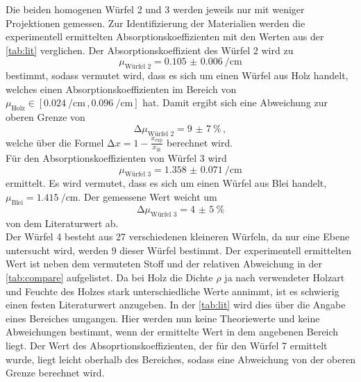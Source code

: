 \noindent Die beiden homogenen Würfel 2 und 3 werden jeweils nur mit weniger Projektionen gemessen. Zur Identifizierung der Materialien werden die 
experimentell ermittelten Absorptionskoeffizienten mit den Werten aus der \autoref{tab:lit} verglichen. Der Absorptionskoeffizient des Würfel 2 wird zu
\begin{equation*}
    \mu_{\text{Würfel 2}} = \SI{0.105(6)}{\per\centi\metre}
\end{equation*}
bestimmt, sodass vermutet wird, dass es sich um einen Würfel aus Holz handelt, welches einen Absorptionskoeffizienten im Bereich von $\mu_{\text{Holz}} \in
[\SI[per-mode=reciprocal]{0.024}{\per\centi\metre}\, , \SI[per-mode=reciprocal]{0.096}{\per\centi\metre}]$ hat. Damit ergibt sich eine Abweichung zur oberen Grenze von 
\begin{equation*}
    \increment \mu_{\text{Würfel 2}} = \SI{9(7)}{\percent}\, ,
\end{equation*}
welche über die Formel $\increment x = 1 - \frac{x_{\text{exp}}}{x_{\text{lit}}}$ berechnet wird. \\
Für den Absorptionskoeffizienten von Würfel 3 wird 
\begin{equation*}
    \mu_{\text{Würfel 3}} = \SI{1.358(71)}{\per\centi\metre}
\end{equation*}
ermittelt. Es wird vermutet, dass es sich um einen Würfel aus Blei handelt, $\mu_{\text{Blei}} = \SI[per-mode=reciprocal]{1.415}{\per\centi\metre}$. Der gemessene Wert 
weicht um 
\begin{equation*}
    \increment \mu_{\text{Würfel 3}} = \SI{4(5)}{\percent}
\end{equation*}
von dem Literaturwert ab.\\
Der Würfel 4 besteht aus 27 verschiedenen kleineren Würfeln, da nur eine Ebene untersucht wird, werden 9 dieser Würfel bestimmt. Der experimentell ermittelten 
Wert ist neben dem vermuteten Stoff und der relativen Abweichung in der \autoref{tab:compare} aufgelistet. Da bei Holz die Dichte $\rho$ ja nach verwendeter Holzart
und Feuchte des Holzes stark unterschiedliche Werte annimmt, ist es schwierig einen festen Literaturwert anzugeben. In der \autoref{tab:lit} wird dies über die 
Angabe eines Bereiches umgangen. Hier werden nun keine Theoriewerte und keine Abweichungen bestimmt, wenn der ermittelte Wert in dem angebenen Bereich liegt. 
Der Wert des Absoprtionskoeffizienten, der für den Würfel 7 ermittelt wurde, liegt leicht oberhalb des Bereiches, sodass eine Abweichung von der oberen Grenze 
berechnet wird. 

